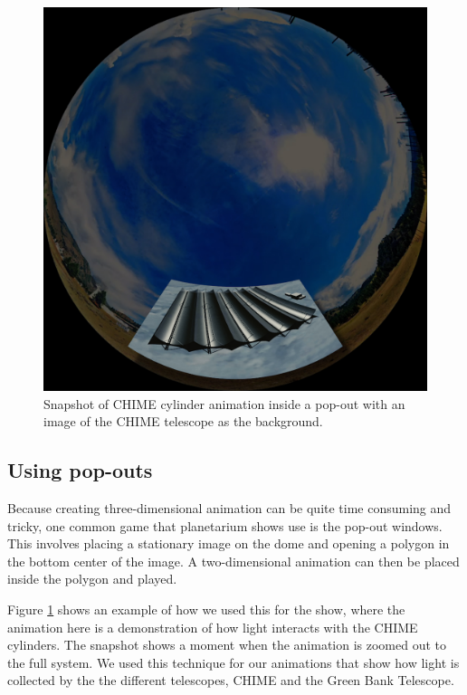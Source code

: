 \begin{figure}[htb]
\begin{center}
\includegraphics[width=0.95\linewidth]{Planetarium/figures/CHIME_animation.jpg}
\caption{Snapshot of CHIME cylinder animation inside a pop-out with an image of the CHIME telescope as the background.}
\label{Fig:CHIME_animate}
\end{center}
\end{figure}
\subsection{Using pop-outs}
Because creating three-dimensional animation can be quite time consuming and tricky, one common game that planetarium shows use is the pop-out windows. This involves placing a stationary image on the dome and opening a polygon in the bottom center of the image. A two-dimensional animation can then be placed inside the polygon and played. 

Figure \ref{Fig:CHIME_animate} shows an example of how we used this for the show, where the animation here is a demonstration of how light interacts with the CHIME cylinders. The snapshot shows a moment when the animation is zoomed out to the full system. We used this technique for our animations that show how light is collected by the the different telescopes, CHIME and the Green Bank Telescope. 

